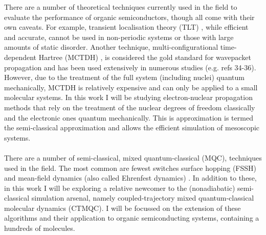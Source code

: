 There are a number of theoretical techniques currently used in the field to evaluate the performance of organic semiconductors, though all come with their own caveats. For example, transient localisation theory (TLT) \cite{Nematiaram2019, PhysRevB.83.081202, Fratini_2016}, while efficient and accurate, cannot be used in non-periodic systems or those with large amounts of static disorder. Another technique, multi-configurational time-dependent Hartree (MCTDH) \cite{MCTDH, cattarius_all_2001}, is considered the gold standard for wavepacket propagation and has been used extensively in numerous studies (e.g. refs 34-36). However, due to the treatment of the full system  (including nuclei) quantum mechanically, MCTDH is relatively expensive and can only be applied to a small molecular systems. In this work I will be studying electron-nuclear propagation methods that rely on the treatment of the nuclear degrees of freedom classically and the electronic ones quantum mechanically. This is approximation is termed the semi-classical approximation and allows the efficient simulation of mesoscopic systems.
\\\\
There are a number of semi-classical, mixed quantum-classical (MQC),  techniques used in the field. The most common are fewest switches surface hopping (FSSH) \cite{FSSH_orig} and mean-field dynamics (also called Ehrenfest dynamics) \cite{Ehrenfest1927}. In addition to these, in this work I will be exploring a relative newcomer to the (nonadiabatic) semi-classical simulation arsenal, namely coupled-trajectory mixed quantum-classical molecular dynamics (CTMQC). I will be focussed on the extension of these algorithms and their application to organic semiconducting systems, containing a hundreds of molecules.

